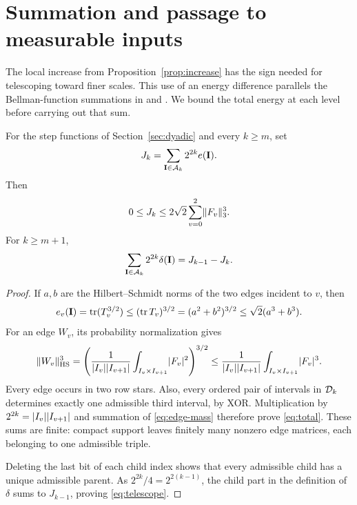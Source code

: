 \section{Summation and passage to measurable inputs}\label{sec:summation}

The local increase from Proposition~\ref{prop:increase} has the sign
needed for telescoping toward finer scales. This use of an energy
difference parallels the Bellman-function summations in
\cite[Section~2]{Kovac2011} and \cite[Lemma~2]{Kovac2012}.
We bound the total energy at each level before carrying out that sum.

\begin{lemma}\label{lem:total}
For the step functions of Section~\ref{sec:dyadic} and every \(k\ge m\),
set
\[
 J_k=\sum_{\mathbf I\in\mathcal A_k}2^{2k}e(\mathbf I).
\]
Then
\begin{equation}\label{eq:total}
 0\le J_k\le2\sqrt2\sum_{v=0}^2\lVert F_v\rVert_3^3.
\end{equation}
For \(k\ge m+1\),
\begin{equation}\label{eq:telescope}
 \sum_{\mathbf I\in\mathcal A_k}2^{2k}\delta(\mathbf I)
       =J_{k-1}-J_k.
\end{equation}
\end{lemma}

\begin{proof}
If \(a,b\) are the Hilbert--Schmidt norms of the two edges incident
to \(v\), then
\[
 e_v(\mathbf I)
 =\operatorname{tr}(T_v^{3/2})
 \le(\operatorname{tr} T_v)^{3/2}
 =(a^2+b^2)^{3/2}
 \le\sqrt2(a^3+b^3).
\]
For an edge \(W_v\), its probability normalization gives
\begin{equation}\label{eq:edge-mass}
 \lVert W_v\rVert_{\mathrm{HS}}^3
 =\left(\frac1{\lvert I_v\rvert\lvert I_{v+1}\rvert}
          \int_{I_v\times I_{v+1}}\lvert F_v\rvert^2\right)^{3/2}
 \le \frac1{\lvert I_v\rvert\lvert I_{v+1}\rvert}
          \int_{I_v\times I_{v+1}}\lvert F_v\rvert^3.
\end{equation}
Every edge occurs in two row stars. Also, every ordered pair of
intervals in \(\mathcal D_k\) determines exactly one admissible third
interval, by XOR. Multiplication by \(2^{2k}=\lvert I_v\rvert\lvert I_{v+1}\rvert\)
and summation of \eqref{eq:edge-mass} therefore prove \eqref{eq:total}.
These sums are finite: compact support leaves finitely many nonzero
edge matrices, each belonging to one admissible triple.

Deleting the last bit of each child index shows that every admissible
child has a unique admissible parent. As
\(2^{2k}/4=2^{2(k-1)}\), the child part in the definition of
\(\delta\) sums to \(J_{k-1}\), proving \eqref{eq:telescope}.
\end{proof}

